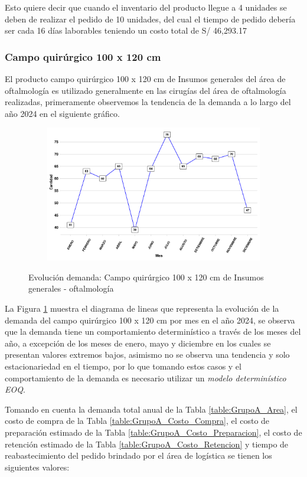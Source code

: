 Esto quiere decir que cuando el inventario del producto llegue a 4 unidades se deben de realizar el pedido de 10 unidades, del cual el tiempo de pedido debería ser cada 16 días laborables teniendo un costo total de S/ 46,293.17
\subsubsection{Campo quirúrgico 100 x 120 cm}

El producto campo quirúrgico 100 x 120 cm de Insumos generales del área de oftalmología es utilizado generalmente en las cirugías del área de oftalmología realizadas, primeramente observemos la tendencia de la demanda a lo largo del año 2024 en el siguiente gráfico.
\clearpage
\begin{figure}[H]
  \caption{Evolución demanda: Campo quirúrgico 100 x 120 cm de Insumos generales - oftalmología}
  {\includegraphics[width=15cm, height=5.95cm]{images/PROD016_demanda.pdf}}
  \label{fig:PROD016_demanda}
\end{figure}

La Figura \ref{fig:PROD016_demanda} muestra el diagrama de lineas que representa la evolución de la demanda del campo quirúrgico 100 x 120 cm por mes en el año 2024, se observa que la demanda tiene un comportamiento determinístico a través de los meses del año, a excepción de los meses de enero, mayo y diciembre en los cuales se presentan valores extremos bajos, asimismo no se observa una tendencia y solo estacionariedad en el tiempo, por lo que tomando estos casos y el comportamiento de la demanda es necesario utilizar un \textsl{modelo determinístico EOQ}.

Tomando en cuenta la demanda total anual de la Tabla \ref{table:GrupoA_Area}, el costo de compra de la Tabla \ref{table:GrupoA_Costo_Compra}, el costo de preparación estimado de la Tabla \ref{table:GrupoA_Costo_Preparacion}, el costo de retención estimado de la Tabla \ref{table:GrupoA_Costo_Retencion} y tiempo de reabastecimiento del pedido brindado por el área de logística se tienen los siguientes valores:

